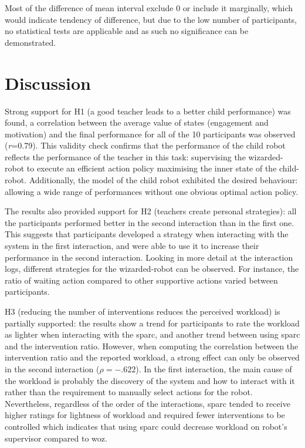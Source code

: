 Most of the difference of mean interval exclude 0 or include it marginally, which would indicate tendency of difference, but due to the low number of participants, no statistical tests are applicable and as such no significance can be demonstrated. 


\section{Discussion}

Strong support for H1 (a good teacher leads to a better child performance) was found, a correlation between the average value of states (engagement and motivation) and the final performance for all of the 10 participants was observed (\textit{r}=0.79). This validity check confirms that the performance of the child robot reflects the performance of the teacher in this task: supervising the wizarded-robot to execute an efficient action policy maximising the inner state of the child-robot. Additionally, the model of the child robot exhibited the desired behaviour: allowing a wide range of performances without one obvious optimal action policy.

The results also provided support for H2 (teachers create personal strategies): all the participants performed better in the second interaction than in the first one. This suggests that participants developed a strategy when interacting with the system in the first interaction, and were able to use it to increase their performance in the second interaction. Looking in more detail at the interaction logs, different strategies for the wizarded-robot can be observed. For instance, the ratio of waiting action compared to other supportive actions varied between participants.

H3 (reducing the number of interventions reduces the perceived workload) is partially supported: the results show a trend for participants to rate the workload as lighter when interacting with the \gls{sparc}, and another trend between using \gls{sparc} and the intervention ratio. However, when computing the correlation between the intervention ratio and the reported workload, a strong effect can only be observed in the second interaction ($\rho = -.622$). In the first interaction, the main cause of the workload is probably the discovery of the system and how to interact with it rather than the requirement to manually select actions for the robot. Nevertheless, regardless of the order of the interactions, \gls{sparc} tended to receive higher ratings for lightness of workload and required fewer interventions to be controlled which indicates that using \gls{sparc} could decrease workload on robot's supervisor compared to \gls{woz}.

